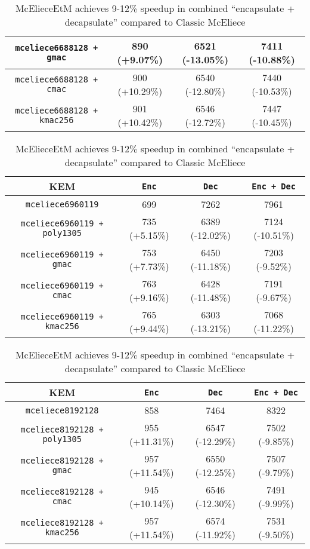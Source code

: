 \documentclass[runningheads]{llncs}
\begin{document}
\begin{table}[hp]
\begin{tabular}[c]{|c|c|c|c|}
        \hline
        \texttt{mceliece6688128 + gmac} & 890 (+9.07\%) & 6521 (-13.05\%) & 7411 (-10.88\%) \\
        \hline
        \texttt{mceliece6688128 + cmac} & 900 (+10.29\%) & 6540 (-12.80\%) & 7440 (-10.53\%) \\
        \hline
        \texttt{mceliece6688128 + kmac256} & 901 (+10.42\%) & 6546 (-12.72\%) & 7447 (-10.45\%) \\
        \hline
    \end{tabular}\vspace{1em}
    \begin{tabular}[c]{|c|c|c|c|}
        \hline
        KEM & \texttt{Enc} & \texttt{Dec} & \texttt{Enc + Dec} \\
        \hline
        \texttt{mceliece6960119} & 699 & 7262 & 7961 \\
        \hline
        \texttt{mceliece6960119 + poly1305} & 735 (+5.15\%) & 6389 (-12.02\%) & 7124 (-10.51\%) \\
        \hline
        \texttt{mceliece6960119 + gmac} & 753 (+7.73\%) & 6450 (-11.18\%) & 7203 (-9.52\%) \\
        \hline
        \texttt{mceliece6960119 + cmac} & 763 (+9.16\%) & 6428 (-11.48\%) & 7191 (-9.67\%) \\
        \hline
        \texttt{mceliece6960119 + kmac256} & 765 (+9.44\%) & 6303 (-13.21\%) & 7068 (-11.22\%) \\
        \hline
    \end{tabular}\vspace{1em}
    \begin{tabular}[c]{|c|c|c|c|}
        \hline
        KEM & \texttt{Enc} & \texttt{Dec} & \texttt{Enc + Dec} \\
        \hline
        \texttt{mceliece8192128} & 858 & 7464 & 8322 \\
        \hline
        \texttt{mceliece8192128 + poly1305} & 955 (+11.31\%) & 6547 (-12.29\%) & 7502 (-9.85\%) \\
        \hline
        \texttt{mceliece8192128 + gmac} & 957 (+11.54\%) & 6550 (-12.25\%) & 7507 (-9.79\%) \\
        \hline
        \texttt{mceliece8192128 + cmac} & 945 (+10.14\%) & 6546 (-12.30\%) & 7491 (-9.99\%) \\
        \hline
        \texttt{mceliece8192128 + kmac256} & 957 (+11.54\%) & 6574 (-11.92\%) & 7531 (-9.50\%) \\
        \hline
    \end{tabular}\vspace{1em}
    \caption{McElieceEtM achieves 9-12\% speedup in combined ``encapsulate + decapsulate'' compared to Classic McEliece}\label{tbl:mceliece-plus-performance}
\end{table}
\end{document}
